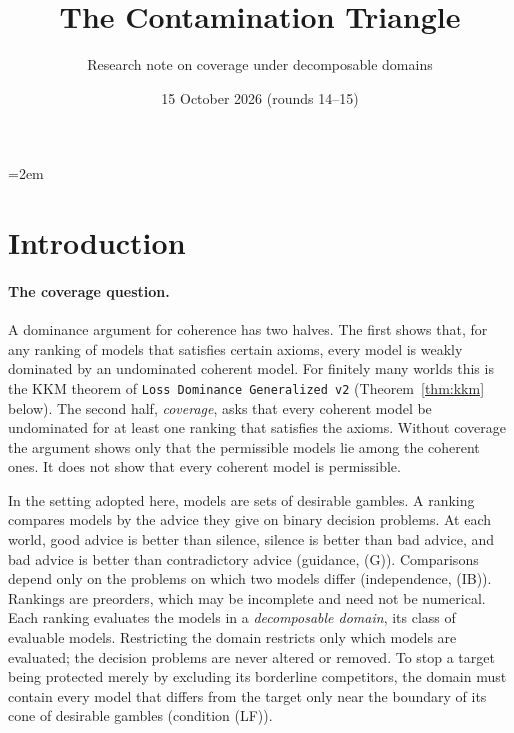 \documentclass[11pt]{article}
\title{The Contamination Triangle}
\author{Research note on coverage under decomposable domains}
\date{15 October 2026 (rounds 14--15)}
\theoremstyle{definition}
\theoremstyle{remark}
\newcommand{\src}[1]{\texttt{#1}}
\begin{document}
\emergencystretch=2em
\maketitle

\section{Introduction}\label{sec:intro}

\paragraph{The coverage question.}
A dominance argument for coherence has two halves. The first shows that, for any ranking of models that satisfies certain axioms, every model is weakly dominated by an undominated coherent model. For finitely many worlds this is the KKM theorem of \src{Loss Dominance Generalized v2} (Theorem~\ref{thm:kkm} below). The second half, \emph{coverage}, asks that every coherent model be undominated for at least one ranking that satisfies the axioms. Without coverage the argument shows only that the permissible models lie among the coherent ones. It does not show that every coherent model is permissible.

In the setting adopted here, models are sets of desirable gambles. A ranking compares models by the advice they give on binary decision problems. At each world, good advice is better than silence, silence is better than bad advice, and bad advice is better than contradictory advice (guidance, (G)). Comparisons depend only on the problems on which two models differ (independence, (IB)). Rankings are preorders, which may be incomplete and need not be numerical. Each ranking evaluates the models in a \emph{decomposable domain}, its class of evaluable models. Restricting the domain restricts only which models are evaluated; the decision problems are never altered or removed. To stop a target being protected merely by excluding its borderline competitors, the domain must contain every model that differs from the target only near the boundary of its cone of desirable gambles (condition (LF)).
\end{document}

